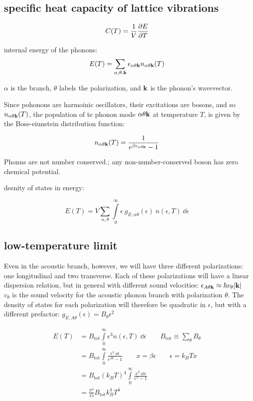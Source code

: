 \documentclass[10pt, a4paper, twocolumn]{article}
\begin{document}
\subsection{specific heat capacity of lattice vibrations}

\[C(T) = \frac1V\pdv{E}{T}\]

internal energy of the phonons:
\[E(T)=\sum_{\alpha ,\theta ,\vb k}
\epsilon _{\alpha \theta \vb k}
n_{\alpha \theta \vb k}(T)\]

$\alpha$ is the branch, $\theta $ labels the polarization, and $\vb k$ is the phonon's wavevector.

Since pohonons are harmoinic oscillators, their excitations are bosons, and so $
n_{\alpha \theta \vb k} (T)$, the population of te phonon mode $\alpha \theta \vb k$ at temperature $T$, is given by the Bose-eiunstein distribution function:

\[n_{\alpha \theta \vb k} (T)
=\frac{1}{e^{\beta \epsilon _{\alpha \theta \vb k}}-1}\]

Phonns are not number conserved.; any non-number-conserved boson has zero chemical potential.

desnity of states in energy:

\[E(T)=V\sum _{\alpha ,\theta}
\int\limits_{0}^{\infty}
\epsilon\ g_{E,\alpha\theta}(\epsilon)
\ n(\epsilon ,T)\ \dd \epsilon\]

\subsection{low-temperature limit}

Even in the acoustic branch, however, we will have three different polarizations: one longitudinal and two transverse. Each of these polarizations will have a linear dispersion relation, but in general with different sound velocities:
$\epsilon _{A\theta\vb k}\approx \hbar v_\theta
\abs{\vb k}$
$v_\theta$ is the sound velocity for the acoustic phonon branch with polarization $\theta$. The density of states for each polarization will therefore be quadratic in $\epsilon$, but with a different prefactor:
$g_{E,A\theta}(\epsilon)=B_\theta \epsilon ^2$

\begin{equation*}
\begin{aligned}
E(T) &= B_\mathrm{tot}\int\limits_0^\infty
\epsilon ^3 n(\epsilon ,T)\ \dd \epsilon
\qquad B_\mathrm{tot}\equiv \sum _\theta B_\theta
\\&= B_\mathrm{tot}\int\limits_0^\infty
\frac{\epsilon ^3\ \dd \epsilon}{e^{\beta\theta}-1}
\qquad x= \beta\epsilon\qquad\epsilon=k_BTx
\\&=B_\mathrm{tot}(k_BT)^4\int\limits_0^\infty
\frac{x^3\ \dd x}{e^x-1}
\\&=\frac{\pi ^4}{15}B_\mathrm{tot}k^4_BT^4
\end{aligned}
\end{equation*}
\end{document}
